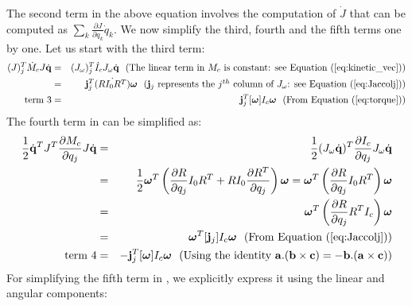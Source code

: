 The second term in the above equation involves the computation of $\dot{J}$ that can be computed as $\sum_k \frac{\partial J}{\partial q_k} \dot{q}_k$. We now simplify the third, fourth and the fifth terms one by one. Let us start with the third term:
\begin{eqnarray}
\label{eq:term3}
\nonumber
(J)_j^T \dot{M}_c J \dot{\vc{q}} & = & (J_\omega)_j^T \dot{I}_c J_\omega \dot{\vc{q}} \mbox{\ \ (The linear term in $M_c$ is constant: see \eqnref{kinetic_vec})}\\
\nonumber
& = & \vc{j}_j^T\dot{(RI_0 R^T)}\bm{\omega} \mbox{\ \ ($\vc{j}_j$ represents the $j^{th}$ column of $J_\omega$: see \eqnref{Jaccolj})} \\
\mbox{term 3} & = & \vc{j}_j^T[\bm{\omega}]I_c \bm{\omega}  \mbox{\ \ (From \eqnref{torque})}
\end{eqnarray}
The fourth term in  can be simplified as:
\begin{eqnarray}
\label{eq:term4}
\nonumber
\frac{1}{2}\dot{\vc{q}}^T J^T \frac{\partial M_c}{\partial q_j} J \dot{\vc{q}} & = & \frac{1}{2} (J_\omega \dot{\vc{q}})^T \frac{\partial I_c}{\partial q_j} J_\omega \dot{\vc{q}}\\
\nonumber
& = & \frac{1}{2} \bm{\omega}^T \left ( \frac{\partial R}{\partial q_j}I_0R^T + RI_0\frac{\partial R^T}{\partial q_j} \right )  \bm{\omega} = \bm{\omega}^T \left ( \frac{\partial R}{\partial q_j}I_0R^T \right ) \bm{\omega} \\
\nonumber
& = & \bm{\omega}^T \left ( \frac{\partial R}{\partial q_j}R^T I_c \right ) \bm{\omega}\\
\nonumber
 & = & \bm{\omega}^T [\vc{j}_j] I_c \bm{\omega} \mbox{\ \ (From \eqnref{Jaccolj})}\\
\mbox{term 4}  & = & - \vc{j}_j^T[\bm{\omega}]I_c \bm{\omega} \mbox{\ \ (Using the identity $\vc{a}.(\vc{b}\times\vc{c}) = -\vc{b}.(\vc{a}\times\vc{c}))$}
\end{eqnarray}
For simplifying the fifth term in , we explicitly express it using the linear and angular components:
